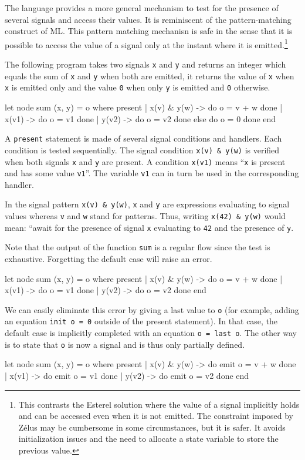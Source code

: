 \documentclass[11pt,titlepage,twoside]{report}
\newcommand{\zelus}{{\sf Z\'elus}}
\newcommand{\esterel}{{\sf Esterel}}
\begin{document}
The language provides a more general mechanism to test for the
presence of several signals and access their values. It is reminiscent
of the pattern-matching construct of ML.  This pattern matching
mechanisn is safe in the sense that it is possible to access the value
of a signal only at the instant where it is emitted.\footnote{This
  contrasts the \esterel{} solution where the value of a signal
  implicitly holds and can be accessed even when it is not
  emitted. The constraint imposed by \zelus{} may be cumbersome in some circumstances,
  but it is safer. It avoids initialization issues and
  the need to allocate a state variable to store the previous
  value.}

The following program takes two signals \verb-x- and \verb-y- and
returns an integer which equals the sum of \verb-x- and \verb-y- when
both are emitted, it returns the value of \verb-x- when \verb-x- is
emitted only and the value \verb-0- when only \verb-y- is emitted and
\verb-0- otherwise.
\begin{chklisting}[withresult]
let node sum (x, y) = o where
  present
  | x(v) & y(w) -> do o = v + w done
  | x(v1) -> do o = v1 done
  | y(v2) -> do o = v2 done
  else do o = 0 done
  end
\end{chklisting}
A \verb-present- statement is made of several signal conditions and
handlers. Each condition is tested sequentially. The signal condition
\verb-x(v) & y(w)- is verified when both signals \verb-x- and \verb-y-
are present. A condition \verb-x(v1)- means ``\verb-x- is present and
has some value \verb-v1-''. The variable \verb-v1- can in turn be used
in the corresponding handler.

In the signal pattern \verb-x(v) & y(w)-, \verb-x- and \verb-y- are
expressions evaluating to signal values whereas \verb-v- and \verb-w-
stand for patterns. Thus, writing \verb-x(42) & y(w)- would mean:
``await for the presence of signal \verb-x- evaluating to \verb-42-
and the presence of \verb-y-.

Note that the output of the function \verb-sum- is a regular flow
since the test is exhaustive. Forgetting the default case will raise
an error.
\begin{chklisting}
let node sum (x, y) = o where
  present
  | x(v) & y(w) -> do o = v + w done
  | x(v1) -> do o = v1 done
  | y(v2) -> do o = v2 done
  end
\end{chklisting}

We can easily eliminate this error by giving a last value to \verb-o-
(for example, adding an equation \verb-init o = 0- outside of the present
statement). In that case, the default case is implicitly completed
with an equation \verb-o = last o-. The other way is to state that
\verb-o- is now a signal and is thus only partially defined.
\begin{chklisting}[withresult]
let node sum (x, y) = o where
  present
  | x(v) & y(w) -> do emit o = v + w done
  | x(v1) -> do emit o = v1 done
  | y(v2) -> do emit o = v2 done
  end
\end{chklisting}
\end{document}
